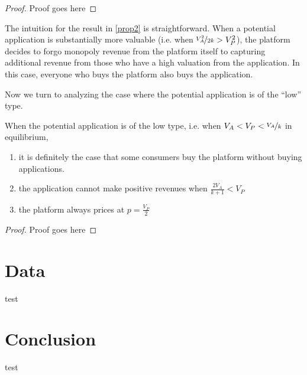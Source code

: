 \documentclass[12pt]{article}
\begin{document}
\begin{proof}
Proof goes here
\end{proof}

The intuition for the result in \ref{prop2} is straightforward. When a
potential application is substantially more valuable (i.e. when
$\nicefrac{V_A^2}{2k}>V_P^2$), the platform decides to forgo monopoly
revenue from the platform itself to capturing additional revenue from
those who have a high valuation from the application. In this
case, everyone who buys the platform also buys the
application. 

Now we turn to analyzing the case where the potential application is
of the ``low'' type.


\begin{proposition}
\label{prop3}
When the potential application is of the low type, i.e. when
$V_A<V_P<\nicefrac{V_A}{k}$ in equilibrium, 
\begin{enumerate}

\item it is definitely the case
that some consumers buy the platform without buying applications.

\item the application cannot make positive revenues when
  $\frac{2V_A}{k+1}<V_P$

\item the platform always prices at $p=\frac{V_P}{2}$

\end{enumerate}
\end{proposition}

\begin{proof}
Proof goes here
\end{proof}



\section{Data}
test
\section{Conclusion}
test



\end{document}
